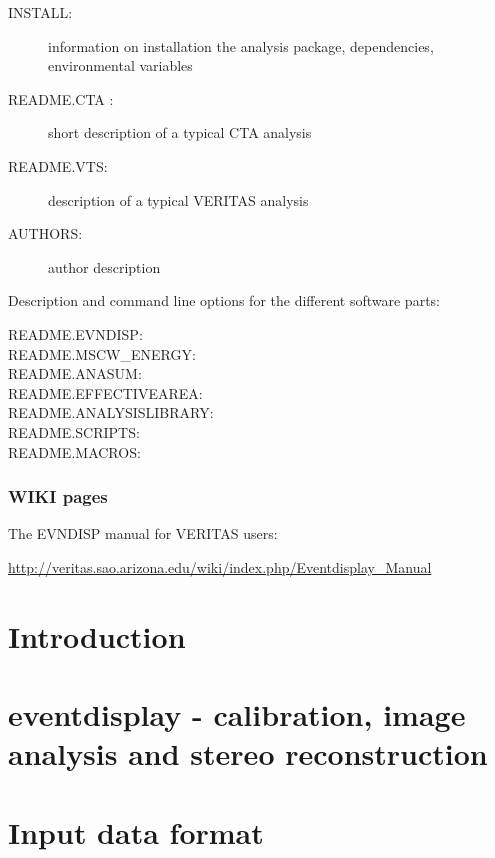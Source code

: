 \documentclass[titlepage,a4paper,twoside,11pt]{report}
\newcommand{\clearemptydoublepage}{\newpage{\pagestyle{empty}\cleardoublepage}}
\begin{document}
\begin{description}
\item[INSTALL:]   information on installation the analysis package, dependencies, environmental variables
\item[README.CTA :]  short description of a typical CTA analysis
\item[README.VTS:]      description of a typical VERITAS analysis
\item[AUTHORS:]		author description
\end{description}

\noindent Description and command line options for the different software parts:

\begin{description}
\item[README.EVNDISP:]
\item[README.MSCW\_ENERGY:]
\item[README.ANASUM:]
\item[README.EFFECTIVEAREA:]
\item[README.ANALYSISLIBRARY:]
\item[README.SCRIPTS:]
\item[README.MACROS:]
\end{description}

\subsection*{WIKI pages}

The EVNDISP manual for VERITAS users: 

\url{http://veritas.sao.arizona.edu/wiki/index.php/Eventdisplay\_Manual}

\clearemptydoublepage

\chapter{Introduction}

\chapter{eventdisplay - calibration, image analysis and stereo reconstruction}

\chapter{Input data format}
\end{document}
